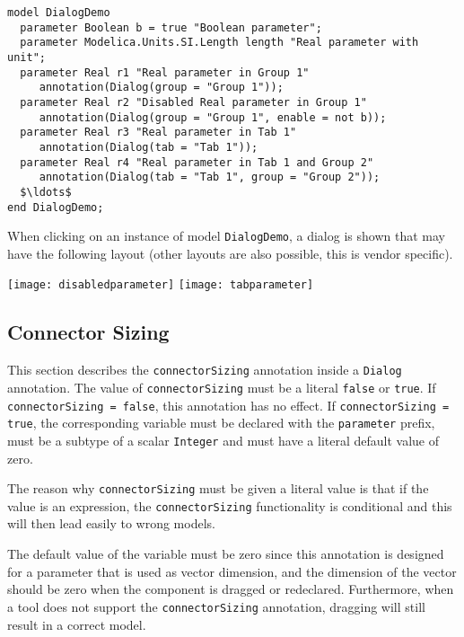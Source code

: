 \begin{example}
\begin{lstlisting}[language=modelica]
model DialogDemo
  parameter Boolean b = true "Boolean parameter";
  parameter Modelica.Units.SI.Length length "Real parameter with unit";
  parameter Real r1 "Real parameter in Group 1"
     annotation(Dialog(group = "Group 1"));
  parameter Real r2 "Disabled Real parameter in Group 1"
     annotation(Dialog(group = "Group 1", enable = not b));
  parameter Real r3 "Real parameter in Tab 1"
     annotation(Dialog(tab = "Tab 1"));
  parameter Real r4 "Real parameter in Tab 1 and Group 2"
     annotation(Dialog(tab = "Tab 1", group = "Group 2"));
  $\ldots$
end DialogDemo;
\end{lstlisting}
When clicking on an instance of model \lstinline!DialogDemo!, a dialog is shown that may have the following layout (other layouts are also possible, this is vendor specific).

\begin{center}
\texttt{[image: disabledparameter]}
\quad
\texttt{[image: tabparameter]}\\
\end{center}
\end{example}

\subsection{Connector Sizing}\label{connector-sizing}

This section describes the \lstinline!connectorSizing! annotation inside a \lstinline!Dialog! annotation.
The value of \lstinline!connectorSizing! must be a literal \lstinline!false! or \lstinline!true!.
If \lstinline!connectorSizing = false!, this annotation has no effect.
If \lstinline!connectorSizing = true!, the corresponding variable must be declared with the \lstinline!parameter! prefix, must be a subtype of a scalar \lstinline!Integer! and must have a literal default value of zero.

\begin{nonnormative}
The reason why \lstinline!connectorSizing! must be given a literal value is that if the value is an expression,
the \lstinline!connectorSizing! functionality is conditional and this will then lead easily to wrong models.

The default value of the variable must be zero since this annotation is designed for a parameter that is used as vector dimension, and the dimension of the vector should be zero when the component is dragged or redeclared.
Furthermore, when a tool does not support the \lstinline!connectorSizing! annotation, dragging will still result in a correct model.
\end{nonnormative}

